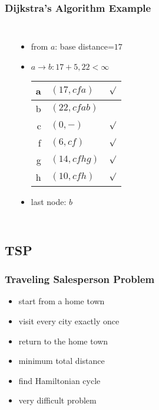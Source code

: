 \documentclass[dvipsnames]{beamer}
\begin{document}
\begin{frame}
  \frametitle{Dijkstra's Algorithm Example}

  \begin{columns}
    \begin{center}
    \end{center}

    \begin{itemize}
      \item from $a$: base distance=$17$
      \item $a \rightarrow b: 17+5, 22 < \infty$

      \pause
      \begin{table}
        \begin{tabular}{r|l|c}
          a & $(17,cfa)$   & $\surd$ \\\hline
          b & $(22,cfab)$  & \\\hline
          c & $(0,-)$      & $\surd$ \\\hline
          f & $(6,cf)$     & $\surd$ \\\hline
          g & $(14,cfhg)$  & $\surd$ \\\hline
          h & $(10,cfh)$   & $\surd$
        \end{tabular}
      \end{table}

      \pause
      \item last node: $b$
    \end{itemize}
  \end{columns}
\end{frame}

\subsection{TSP}

\begin{frame}
  \frametitle{Traveling Salesperson Problem}

  \begin{itemize}
    \item start from a home town
    \item visit every city exactly once
    \item return to the home town
    \item minimum total distance

    \pause
    \medskip
    \item find Hamiltonian cycle
    \item very difficult problem
  \end{itemize}
\end{frame}
\end{document}
